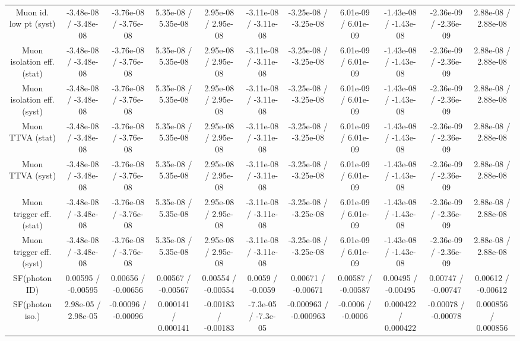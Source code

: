 \begin{table}[htbp]
\begin{center}
\begin{tabular}{|c|c|c|c|c|c|c|c|c|c|c|}
  Muon id. low pt (syst) & -3.48e-08 / -3.48e-08 & -3.76e-08 / -3.76e-08 & 5.35e-08 / 5.35e-08 & 2.95e-08 / 2.95e-08 & -3.11e-08 / -3.11e-08 & -3.25e-08 / -3.25e-08 & 6.01e-09 / 6.01e-09 & -1.43e-08 / -1.43e-08 & -2.36e-09 / -2.36e-09 & 2.88e-08 / 2.88e-08 \\ 
  Muon isolation eff. (stat) & -3.48e-08 / -3.48e-08 & -3.76e-08 / -3.76e-08 & 5.35e-08 / 5.35e-08 & 2.95e-08 / 2.95e-08 & -3.11e-08 / -3.11e-08 & -3.25e-08 / -3.25e-08 & 6.01e-09 / 6.01e-09 & -1.43e-08 / -1.43e-08 & -2.36e-09 / -2.36e-09 & 2.88e-08 / 2.88e-08 \\ 
  Muon isolation eff. (syst) & -3.48e-08 / -3.48e-08 & -3.76e-08 / -3.76e-08 & 5.35e-08 / 5.35e-08 & 2.95e-08 / 2.95e-08 & -3.11e-08 / -3.11e-08 & -3.25e-08 / -3.25e-08 & 6.01e-09 / 6.01e-09 & -1.43e-08 / -1.43e-08 & -2.36e-09 / -2.36e-09 & 2.88e-08 / 2.88e-08 \\ 
  Muon TTVA (stat) & -3.48e-08 / -3.48e-08 & -3.76e-08 / -3.76e-08 & 5.35e-08 / 5.35e-08 & 2.95e-08 / 2.95e-08 & -3.11e-08 / -3.11e-08 & -3.25e-08 / -3.25e-08 & 6.01e-09 / 6.01e-09 & -1.43e-08 / -1.43e-08 & -2.36e-09 / -2.36e-09 & 2.88e-08 / 2.88e-08 \\ 
  Muon TTVA (syst) & -3.48e-08 / -3.48e-08 & -3.76e-08 / -3.76e-08 & 5.35e-08 / 5.35e-08 & 2.95e-08 / 2.95e-08 & -3.11e-08 / -3.11e-08 & -3.25e-08 / -3.25e-08 & 6.01e-09 / 6.01e-09 & -1.43e-08 / -1.43e-08 & -2.36e-09 / -2.36e-09 & 2.88e-08 / 2.88e-08 \\ 
  Muon trigger eff. (stat) & -3.48e-08 / -3.48e-08 & -3.76e-08 / -3.76e-08 & 5.35e-08 / 5.35e-08 & 2.95e-08 / 2.95e-08 & -3.11e-08 / -3.11e-08 & -3.25e-08 / -3.25e-08 & 6.01e-09 / 6.01e-09 & -1.43e-08 / -1.43e-08 & -2.36e-09 / -2.36e-09 & 2.88e-08 / 2.88e-08 \\ 
  Muon trigger eff. (syst) & -3.48e-08 / -3.48e-08 & -3.76e-08 / -3.76e-08 & 5.35e-08 / 5.35e-08 & 2.95e-08 / 2.95e-08 & -3.11e-08 / -3.11e-08 & -3.25e-08 / -3.25e-08 & 6.01e-09 / 6.01e-09 & -1.43e-08 / -1.43e-08 & -2.36e-09 / -2.36e-09 & 2.88e-08 / 2.88e-08 \\ 
  SF(photon ID) & 0.00595 / -0.00595 & 0.00656 / -0.00656 & 0.00567 / -0.00567 & 0.00554 / -0.00554 & 0.0059 / -0.0059 & 0.00671 / -0.00671 & 0.00587 / -0.00587 & 0.00495 / -0.00495 & 0.00747 / -0.00747 & 0.00612 / -0.00612 \\ 
  SF(photon iso.) & 2.98e-05 / 2.98e-05 & -0.00096 / -0.00096 & 0.000141 / 0.000141 & -0.00183 / -0.00183 & -7.3e-05 / -7.3e-05 & -0.000963 / -0.000963 & -0.0006 / -0.0006 & 0.000422 / 0.000422 & -0.00078 / -0.00078 & 0.000856 / 0.000856 \\ 

\end{tabular}
\end{center}
\end{table}

